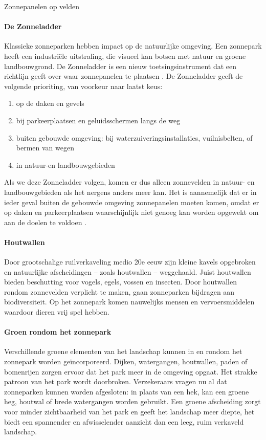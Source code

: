 \begin{voorstel}{Zonnepanelen op velden}
\begin{multicols}{2}
\begin{overwegingen}
\paragraph{De Zonneladder}
Klassieke zonneparken hebben impact op de natuurlijke omgeving. Een zonnepark heeft een industriële uitstraling, die visueel kan botsen met natuur en groene landbouwgrond. De Zonneladder is een nieuw toetsingsinstrument dat een richtlijn geeft over waar zonnepanelen te plaatsen \parencite{dik-faber_motie_2018, sluiter_zonneladder_2019}.
De Zonneladder geeft de volgende prioriting, van voorkeur naar laatst keus:
\begin{enumerate}
	\item op de daken en gevels
	\item bij parkeerplaatsen en geluidsschermen langs de weg
	\item buiten gebouwde omgeving: bij waterzuiveringsinstallaties, vuilnisbelten, of bermen van wegen
	\item in natuur-en landbouwgebieden
\end{enumerate}
Als we deze Zonneladder volgen, komen er dus alleen zonnevelden in natuur- en landbouwgebieden als het nergens anders meer kan.
Het is aannemelijk dat er in ieder geval buiten de gebouwde omgeving zonnepanelen moeten komen, omdat er op daken en parkeerplaatsen waarschijnlijk niet genoeg kan worden opgewekt om aan de doelen te voldoen \parencite{spruijt_wat_2015}.

\paragraph{Houtwallen}
Door grootschalige ruilverkaveling medio 20e eeuw zijn kleine kavels opgebroken en natuurlijke afscheidingen – zoals houtwallen – weggehaald. Juist houtwallen bieden beschutting voor vogels, egels, vossen en insecten. Door houtwallen rondom zonnevelden verplicht te maken, gaan zonneparken bijdragen aan biodiversiteit. Op het zonnepark komen nauwelijks mensen en vervoersmiddelen waardoor dieren vrij spel hebben.

\paragraph{Groen rondom het zonnepark}
Verschillende groene elementen van het landschap kunnen in en rondom het zonnepark worden geïncorporeerd. Dijken, watergangen, houtwallen, paden of bomenrijen zorgen ervoor dat het park meer in de omgeving opgaat. Het strakke patroon van het park wordt doorbroken. Verzekeraars vragen nu al dat zonneparken kunnen worden afgesloten: in plaats van een hek, kan een groene heg, houtwal of brede watergangen worden gebruikt. Een groene afscheiding zorgt voor minder zichtbaarheid van het park en geeft het landschap meer diepte, het biedt een spannender en afwisselender aanzicht dan een leeg, ruim verkaveld landschap.


\end{overwegingen}
\end{multicols}
\end{voorstel}
